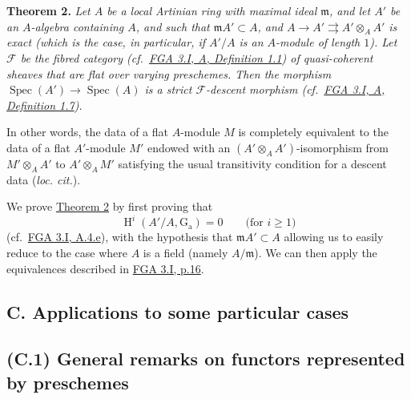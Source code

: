 \documentclass{article}
\newenvironment{itenv}[1]
  {\phantomsection\par\smallskip\noindent\textbf{#1.}\itshape}
  {\par\smallskip}
\theoremstyle{definition}
\theoremstyle{definition}
\theoremstyle{definition}
\theoremstyle{definition}
\theoremstyle{remark}
\begin{document}
\leavevmode{}%
\begin{itenv}{Theorem 2}
Let \(A\) be a local Artinian ring with maximal ideal \({\mathfrak{m}}\), and let \(A'\) be an \(A\)-algebra containing \(A\), and such that \({\mathfrak{m}}A'\subset A\), and \(A\to A'\rightrightarrows A'\otimes_A A'\) is \emph{exact} (which is the case, in particular, if \(A'/A\) is an \(A\)-module of length \(1\)).
Let \({\mathcal{F}}\) be the fibred category (cf.~\protect\hyperlink{fga-3-i-section-A.1-definition-1.1}{FGA 3.I, A, Definition 1.1}) of quasi-coherent sheaves that are flat over varying preschemes.
Then the morphism \(\operatorname{Spec}(A')\to\operatorname{Spec}(A)\) is a \emph{strict \({\mathcal{F}}\)-descent morphism} (cf.~\protect\hyperlink{fga-3-i-section-A.1-definition-1.7}{FGA 3.I, A, Definition 1.7}).

\end{itenv}

In other words, the data of a flat \(A\)-module \(M\) is completely equivalent to the data of a flat \(A'\)-module \(M'\) endowed with an \((A'\otimes_A A')\)-isomorphism from \(M'\otimes_A A'\) to \(A'\otimes_A M'\) satisfying the usual transitivity condition for a descent data (\emph{loc. cit.}).

We prove \protect\hyperlink{fga-3-ii-section-B-theorem-2}{Theorem 2} by first proving that
\[
  \operatorname{H}^i(A'/A,\operatorname{G_a}) = 0
  \qquad\text{(for }i\geqslant 1\text{)}
\]
(cf.~\protect\hyperlink{fga-3-i-section-A.4.e}{FGA 3.I, A.4.e}), with the hypothesis that \({\mathfrak{m}}A'\subset A\) allowing us to easily reduce to the case where \(A\) is a field (namely \(A/{\mathfrak{m}}\)).
We can then apply the equivalences described in \protect\hyperlink{fga-3-i-section-A.4.e}{FGA 3.I, p.16}.

\hypertarget{c.-applications-to-some-particular-cases}{%
\subsection*{\texorpdfstring{\textbf{C.} Applications to some particular cases}{C. Applications to some particular cases}}\label{c.-applications-to-some-particular-cases}}

\hypertarget{fga-3-ii-section-C.1}{%
\subsection{(C.1) General remarks on functors represented by preschemes}\label{fga-3-ii-section-C.1}}
\end{document}
